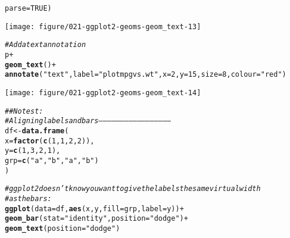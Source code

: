 \documentclass[a4paper,titlepage]{tufte-handout}\usepackage[]{graphicx}\usepackage[]{color}
\makeatletter
\def\maxwidth{ %
  \ifdim\Gin@nat@width>\linewidth
    \linewidth
  \else
    \Gin@nat@width
  \fi
}
\newcommand{\hlnum}[1]{\textcolor[rgb]{0.686,0.059,0.569}{#1}}%
\newcommand{\hlstr}[1]{\textcolor[rgb]{0.192,0.494,0.8}{#1}}%
\newcommand{\hlcom}[1]{\textcolor[rgb]{0.678,0.584,0.686}{\textit{#1}}}%
\newcommand{\hlopt}[1]{\textcolor[rgb]{0,0,0}{#1}}%
\newcommand{\hlstd}[1]{\textcolor[rgb]{0.345,0.345,0.345}{#1}}%
\newcommand{\hlkwb}[1]{\textcolor[rgb]{0.69,0.353,0.396}{#1}}%
\newcommand{\hlkwc}[1]{\textcolor[rgb]{0.333,0.667,0.333}{#1}}%
\newcommand{\hlkwd}[1]{\textcolor[rgb]{0.737,0.353,0.396}{\textbf{#1}}}%
\newenvironment{kframe}{%
 \def\at@end@of@kframe{}%
 \ifinner\ifhmode%
  \def\at@end@of@kframe{\end{minipage}}%
  \begin{minipage}{\columnwidth}%
 \fi\fi%
 \def\FrameCommand##1{\hskip\@totalleftmargin \hskip-\fboxsep
 \colorbox{shadecolor}{##1}\hskip-\fboxsep
     \hskip-\linewidth \hskip-\@totalleftmargin \hskip\columnwidth}%
 \MakeFramed {\advance\hsize-\width
   \@totalleftmargin\z@ \linewidth\hsize
   \@setminipage}}%
 {\par\unskip\endMakeFramed%
 \at@end@of@kframe}
\newenvironment{knitrout}{}{} %
\makeatother
\begin{document}
\begin{knitrout}
\begin{kframe}
\begin{alltt}
  \hlkwc{parse} \hlstd{=} \hlnum{TRUE}\hlstd{)}
\end{alltt}
\end{kframe}
\texttt{[image: figure/021-ggplot2-geoms-geom\_text-13]} 
\begin{kframe}\begin{alltt}
\hlcom{# Add a text annotation}
\hlstd{p} \hlopt{+}
  \hlkwd{geom_text}\hlstd{()} \hlopt{+}
  \hlkwd{annotate}\hlstd{(}\hlstr{"text"}\hlstd{,} \hlkwc{label} \hlstd{=} \hlstr{"plot mpg vs. wt"}\hlstd{,} \hlkwc{x} \hlstd{=} \hlnum{2}\hlstd{,} \hlkwc{y} \hlstd{=} \hlnum{15}\hlstd{,} \hlkwc{size} \hlstd{=} \hlnum{8}\hlstd{,} \hlkwc{colour} \hlstd{=} \hlstr{"red"}\hlstd{)}
\end{alltt}
\end{kframe}
\texttt{[image: figure/021-ggplot2-geoms-geom\_text-14]} 
\begin{kframe}\begin{alltt}
\hlcom{## No test: }
\hlcom{# Aligning labels and bars --------------------------------------------------}
\hlstd{df} \hlkwb{<-} \hlkwd{data.frame}\hlstd{(}
  \hlkwc{x} \hlstd{=} \hlkwd{factor}\hlstd{(}\hlkwd{c}\hlstd{(}\hlnum{1}\hlstd{,} \hlnum{1}\hlstd{,} \hlnum{2}\hlstd{,} \hlnum{2}\hlstd{)),}
  \hlkwc{y} \hlstd{=} \hlkwd{c}\hlstd{(}\hlnum{1}\hlstd{,} \hlnum{3}\hlstd{,} \hlnum{2}\hlstd{,} \hlnum{1}\hlstd{),}
  \hlkwc{grp} \hlstd{=} \hlkwd{c}\hlstd{(}\hlstr{"a"}\hlstd{,} \hlstr{"b"}\hlstd{,} \hlstr{"a"}\hlstd{,} \hlstr{"b"}\hlstd{)}
\hlstd{)}

\hlcom{# ggplot2 doesn't know you want to give the labels the same virtual width}
\hlcom{# as the bars:}
\hlkwd{ggplot}\hlstd{(}\hlkwc{data} \hlstd{= df,} \hlkwd{aes}\hlstd{(x, y,} \hlkwc{fill} \hlstd{= grp,} \hlkwc{label} \hlstd{= y))} \hlopt{+}
  \hlkwd{geom_bar}\hlstd{(}\hlkwc{stat} \hlstd{=} \hlstr{"identity"}\hlstd{,} \hlkwc{position} \hlstd{=} \hlstr{"dodge"}\hlstd{)} \hlopt{+}
  \hlkwd{geom_text}\hlstd{(}\hlkwc{position} \hlstd{=} \hlstr{"dodge"}\hlstd{)}
\end{alltt}



\end{kframe}
\end{knitrout}
\end{document}
